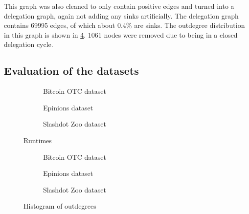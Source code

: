 This graph was also cleaned to only contain positive edges and turned into a delegation graph, again not adding any sinks artificially. The delegation graph contains 69995 edges, of which about 0.4\% are sinks. The outdegree distribution in this graph is shown in \cref{subfig:slashdot_outdegrees}. 1061 nodes were removed due to being in a closed delegation cycle.
 
 \subsection{Evaluation of the datasets}
 \label{subsec:datasets_eval}
 
\begin{figure}[t]
    \centering
        \begin{subfigure}[t]{0.30\textwidth}
        \caption{Bitcoin OTC dataset}
    \end{subfigure}
    \hfill
        \begin{subfigure}[t]{0.30\textwidth}
        \caption{Epinions dataset}
    \end{subfigure}
    \hfill
    \begin{subfigure}[t]{0.30\textwidth}
    	\centering
    	\caption{Slashdot Zoo dataset}
    \end{subfigure}
    \caption{Runtimes}
    \label{fig:datasets_runtimes}
\end{figure}

\begin{figure}[t]
    \centering
        \begin{subfigure}[t]{0.30\textwidth}
        \caption{Bitcoin OTC dataset}
        \label{subfig:bitcoinotc_outdegrees}
    \end{subfigure}
    \hfill
        \begin{subfigure}[t]{0.30\textwidth}
        \caption{Epinions dataset}
        \label{subfig:epinions_outdegrees}
    \end{subfigure}
    \hfill
    \begin{subfigure}[t]{0.30\textwidth}
    	\centering
    	\caption{Slashdot Zoo dataset}
	\label{subfig:slashdot_outdegrees}
    \end{subfigure}
    \caption{Histogram of outdegrees}
    \label{fig:datasets_outdegree_distr}
\end{figure}


